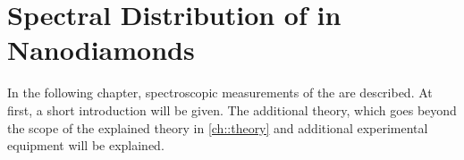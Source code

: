 
\chapter[Spectral Distribution]{Spectral Distribution of \sivs in Nanodiamonds}	\label{ch::distribution}


	In the following chapter, spectroscopic measurements of the \sivs are described.
	At first, a short introduction will be given.
	The additional theory, which goes beyond the scope of the explained theory in \autoref{ch::theory} and additional experimental equipment will be explained.


	
	
	
	

